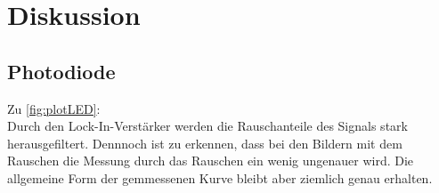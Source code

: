 \newpage
\section{Diskussion}
\subsection{Photodiode}
Zu \ref{fig:plotLED}:\\


\label{sec:Diskussion}
Durch den Lock-In-Verstärker werden die Rauschanteile des Signals stark herausgefiltert.
Dennnoch ist zu erkennen, dass bei den Bildern mit dem Rauschen die Messung durch das Rauschen ein wenig ungenauer wird.
Die allgemeine Form der gemmessenen Kurve bleibt aber ziemlich genau erhalten.
